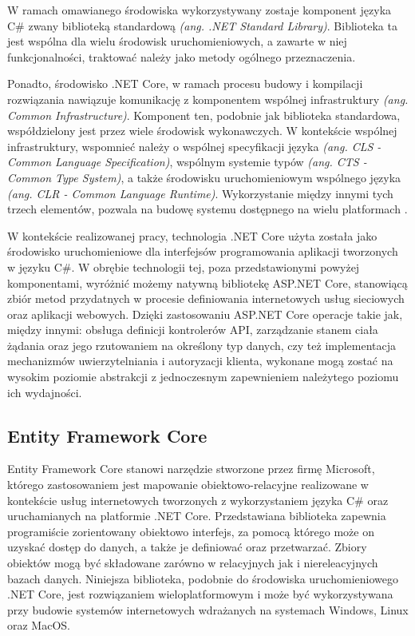 W ramach omawianego środowiska wykorzystywany zostaje komponent języka C\# zwany biblioteką standardową \textit{(ang. .NET Standard Library)}. Biblioteka ta jest wspólna dla wielu środowisk uruchomieniowych, a zawarte w niej funkcjonalności, traktować należy jako metody ogólnego przeznaczenia.

Ponadto, środowisko .NET Core, w ramach procesu budowy i kompilacji rozwiązania nawiązuje komunikację z komponentem wspólnej infrastruktury \textit{(ang. Common Infrastructure)}. Komponent ten, podobnie jak biblioteka standardowa, współdzielony jest przez wiele środowisk wykonawczych. W kontekście wspólnej infrastruktury, wspomnieć należy o wspólnej specyfikacji języka \textit{(ang. CLS - Common Language Specification)}, wspólnym systemie typów \textit{(ang. CTS - Common Type System)}, a także środowisku uruchomieniowym wspólnego języka \textit{(ang. CLR - Common Language Runtime)}. Wykorzystanie między innymi tych trzech elementów, pozwala na budowę systemu dostępnego na wielu platformach \cite{troelsen2017pro}.

W kontekście realizowanej pracy, technologia .NET Core użyta została jako środowisko uruchomieniowe dla interfejsów programowania aplikacji tworzonych w języku C\#. W obrębie technologii tej, poza przedstawionymi powyżej komponentami, wyróżnić możemy natywną bibliotekę ASP.NET Core, stanowiącą zbiór metod przydatnych w procesie definiowania internetowych usług sieciowych oraz aplikacji webowych. Dzięki zastosowaniu ASP.NET Core operacje takie jak, między innymi: obsługa definicji kontrolerów API, zarządzanie stanem ciała żądania oraz jego rzutowaniem na określony typ danych, czy też implementacja mechanizmów uwierzytelniania i autoryzacji klienta, wykonane mogą zostać na wysokim poziomie abstrakcji z jednoczesnym zapewnieniem należytego poziomu ich wydajności.
\subsection*{Entity Framework Core}
Entity Framework Core stanowi narzędzie stworzone przez firmę Microsoft, którego zastosowaniem jest mapowanie obiektowo-relacyjne realizowane w kontekście usług internetowych tworzonych z wykorzystaniem języka C\# oraz uruchamianych na platformie .NET Core. Przedstawiana biblioteka zapewnia programiście zorientowany obiektowo interfejs, za pomocą którego może on uzyskać dostęp do danych, a także je definiować oraz przetwarzać. Zbiory obiektów mogą być składowane zarówno w relacyjnych jak i niereleacyjnych bazach danych. Niniejsza biblioteka, podobnie do środowiska uruchomieniowego .NET Core, jest rozwiązaniem wieloplatformowym i może być wykorzystywana przy budowie systemów internetowych wdrażanych na systemach Windows, Linux oraz MacOS.


